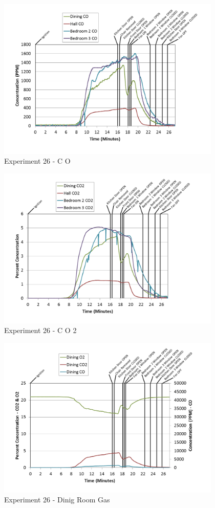 \documentclass{article}
\begin{document}
\begin{appendices}
\begin{figure}[h!]
	\centering
	\includegraphics[height=3.05in]{0_Images/Results_Charts/Exp_26_Charts/CO.png}
	\caption{Experiment 26 - C O}
\end{figure}

\clearpage

\begin{figure}[h!]
	\centering
	\includegraphics[height=3.05in]{0_Images/Results_Charts/Exp_26_Charts/CO2.png}
	\caption{Experiment 26 - C O 2}
\end{figure}


\begin{figure}[h!]
	\centering
	\includegraphics[height=3.05in]{0_Images/Results_Charts/Exp_26_Charts/DinigRoomGas.png}
	\caption{Experiment 26 - Dinig Room Gas}
\end{figure}


\end{appendices}
\end{document}
